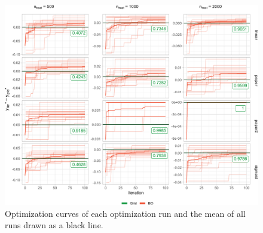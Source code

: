 \documentclass[bimj,fleqn]{w-art}
\theoremstyle{plain}
\theoremstyle{definition}
\begin{document}
\begin{figure}[htb]
\centering
\includegraphics[width=\linewidth]{generated/figures/plot_opt_path.pdf}
\caption{%
  Optimization curves of each optimization run and the mean of all runs drawn as a black line.
  }
\label{fig:plot_opt_path} 
\end{figure}
\end{document}

